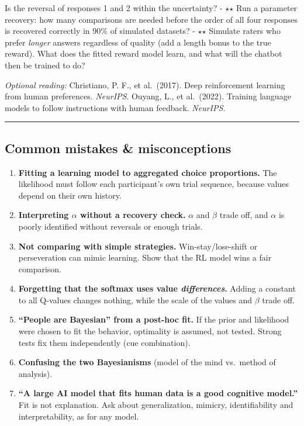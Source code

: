 Is the reversal of responses 1 and 2 within the uncertainty? - \ensuremath{\star}\ensuremath{\star} Run a
parameter recovery: how many comparisons are needed before the order of
all four responses is recovered correctly in 90\% of simulated datasets?
- \ensuremath{\star}\ensuremath{\star} Simulate raters who prefer \emph{longer} answers regardless of
quality (add a length bonus to the true reward). What does the fitted
reward model learn, and what will the chatbot then be trained to do?

\emph{Optional reading:} Christiano, P. F., et al.~(2017). Deep
reinforcement learning from human preferences. \emph{NeurIPS}. Ouyang,
L., et al.~(2022). Training language models to follow instructions with
human feedback. \emph{NeurIPS}.

\begin{center}\rule{0.5\linewidth}{0.5pt}\end{center}

\subsection{Common mistakes \& misconceptions}

\begin{enumerate}
\def\labelenumi{\arabic{enumi}.}
\tightlist
\item
  \textbf{Fitting a learning model to aggregated choice proportions.}
  The likelihood must follow each participant's own trial sequence,
  because values depend on their own history.
\item
  \textbf{Interpreting \(\alpha\) without a recovery check.} \(\alpha\)
  and \(\beta\) trade off, and \(\alpha\) is poorly identified without
  reversals or enough trials.
\item
  \textbf{Not comparing with simple strategies.} Win-stay/lose-shift or
  perseveration can mimic learning. Show that the RL model wins a fair
  comparison.
\item
  \textbf{Forgetting that the softmax uses value \emph{differences}.}
  Adding a constant to all Q-values changes nothing, while the scale of
  the values and \(\beta\) trade off.
\item
  \textbf{``People are Bayesian'' from a post-hoc fit.} If the prior and
  likelihood were chosen to fit the behavior, optimality is assumed, not
  tested. Strong tests fix them independently (cue combination).
\item
  \textbf{Confusing the two Bayesianisms} (model of the mind vs.~method
  of analysis).
\item
  \textbf{``A large AI model that fits human data is a good cognitive
  model.''} Fit is not explanation. Ask about generalization, mimicry,
  identifiability and interpretability, as for any model.
\end{enumerate}

